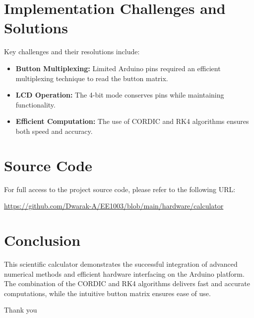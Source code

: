 \documentclass[a4paper,12pt]{article}
\begin{document}
\section{Implementation Challenges and Solutions}
Key challenges and their resolutions include:
\begin{itemize}
    \item \textbf{Button Multiplexing:} Limited Arduino pins required an efficient multiplexing technique to read the button matrix.
    \item \textbf{LCD Operation:} The 4-bit mode conserves pins while maintaining functionality.
    \item \textbf{Efficient Computation:} The use of CORDIC and RK4 algorithms ensures both speed and accuracy.
\end{itemize}

\section{Source Code}
For full access to the project source code, please refer to the following URL:
\begin{center}
\url{https://github.com/Dwarak-A/EE1003/blob/main/hardware/calculator}
\end{center}

\section{Conclusion}
This scientific calculator demonstrates the successful integration of advanced numerical methods and efficient hardware interfacing on the Arduino platform. The combination of the CORDIC and RK4 algorithms delivers fast and accurate computations, while the intuitive button matrix ensures ease of use.

\begin{center}
Thank you
\end{center}
\end{document}

